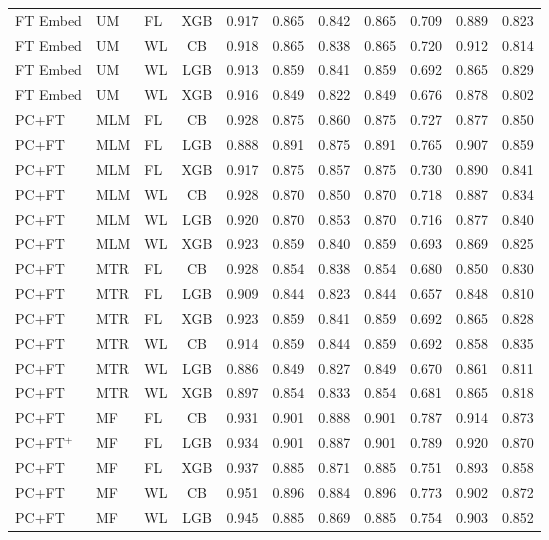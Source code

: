 \documentclass[9pt,a4paper]{article}
\begin{document}
\begin{scriptsize}
\begin{longtable}{lllcrrrrrrr}
FT Embed & UM  & FL & XGB & 0.917 & 0.865 & 0.842 & 0.865 & 0.709 & 0.889 & 0.823 \\
FT Embed & UM  & WL & CB  & 0.918 & 0.865 & 0.838 & 0.865 & 0.720 & 0.912 & 0.814 \\
FT Embed & UM  & WL & LGB & 0.913 & 0.859 & 0.841 & 0.859 & 0.692 & 0.865 & 0.829 \\
FT Embed & UM  & WL & XGB & 0.916 & 0.849 & 0.822 & 0.849 & 0.676 & 0.878 & 0.802 \\
\midrule
PC+FT & MLM & FL & CB  & 0.928 & 0.875 & 0.860 & 0.875 & 0.727 & 0.877 & 0.850 \\
PC+FT & MLM & FL & LGB & 0.888 & 0.891 & 0.875 & 0.891 & 0.765 & 0.907 & 0.859 \\
PC+FT & MLM & FL & XGB & 0.917 & 0.875 & 0.857 & 0.875 & 0.730 & 0.890 & 0.841 \\
PC+FT & MLM & WL & CB  & 0.928 & 0.870 & 0.850 & 0.870 & 0.718 & 0.887 & 0.834 \\
PC+FT & MLM & WL & LGB & 0.920 & 0.870 & 0.853 & 0.870 & 0.716 & 0.877 & 0.840 \\
PC+FT & MLM & WL & XGB & 0.923 & 0.859 & 0.840 & 0.859 & 0.693 & 0.869 & 0.825 \\
PC+FT & MTR & FL & CB  & 0.928 & 0.854 & 0.838 & 0.854 & 0.680 & 0.850 & 0.830 \\
PC+FT & MTR & FL & LGB & 0.909 & 0.844 & 0.823 & 0.844 & 0.657 & 0.848 & 0.810 \\
PC+FT & MTR & FL & XGB & 0.923 & 0.859 & 0.841 & 0.859 & 0.692 & 0.865 & 0.828 \\
PC+FT & MTR & WL & CB  & 0.914 & 0.859 & 0.844 & 0.859 & 0.692 & 0.858 & 0.835 \\
PC+FT & MTR & WL & LGB & 0.886 & 0.849 & 0.827 & 0.849 & 0.670 & 0.861 & 0.811 \\
PC+FT & MTR & WL & XGB & 0.897 & 0.854 & 0.833 & 0.854 & 0.681 & 0.865 & 0.818 \\
PC+FT & MF  & FL & CB  & 0.931 & 0.901 & 0.888 & 0.901 & 0.787 & 0.914 & 0.873 \\
PC+FT$^+$ & MF & FL & LGB & 0.934 & 0.901 & 0.887 & 0.901 & 0.789 & 0.920 & 0.870 \\
PC+FT & MF  & FL & XGB & 0.937 & 0.885 & 0.871 & 0.885 & 0.751 & 0.893 & 0.858 \\
PC+FT & MF  & WL & CB  & 0.951 & 0.896 & 0.884 & 0.896 & 0.773 & 0.902 & 0.872 \\
PC+FT & MF  & WL & LGB & 0.945 & 0.885 & 0.869 & 0.885 & 0.754 & 0.903 & 0.852 \\

\end{longtable}
\end{scriptsize}
\end{document}
